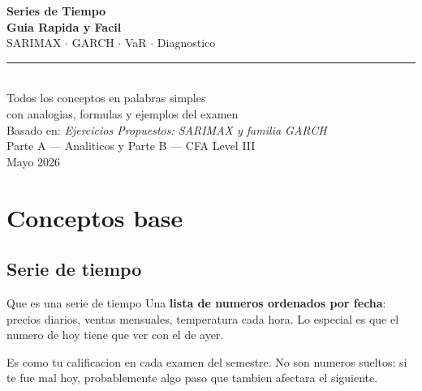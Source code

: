 \documentclass[12pt,a4paper]{article}
\begin{document}

\begin{titlepage}
  \pagecolor{navyblue}
  \color{white}
  \vspace*{3cm}
  \begin{center}
    {\Large\color{teal}\bfseries Series de Tiempo}\\[0.6em]
    {\Huge\bfseries Guia Rapida y Facil}\\[1em]
    {\large\color{midgray} SARIMAX $\cdot$ GARCH $\cdot$ VaR $\cdot$ Diagnostico}\\[2.5em]
    \textcolor{teal}{\rule{8cm}{1.5pt}}\\[2em]
    {\normalsize Todos los conceptos en palabras simples}\\[0.5em]
    {\normalsize\color{midgray} con analogias, formulas y ejemplos del examen}\\[3cm]
    {\small\color{midgray} Basado en: \textit{Ejercicios Propuestos: SARIMAX y familia GARCH}\\
    Parte A --- Analiticos y Parte B --- CFA Level III\\[0.3em]
    Mayo 2026}
  \end{center}
\end{titlepage}
\pagecolor{white}
\color{black}

\tableofcontents
\newpage

\section{Conceptos base}

\subsection{Serie de tiempo}

\begin{definicion}{Que es una serie de tiempo}
Una \textbf{lista de numeros ordenados por fecha}: precios diarios, ventas mensuales,
temperatura cada hora. Lo especial es que el numero de hoy tiene que ver con el de ayer.
\end{definicion}

\begin{analogia}
Es como tu calificacion en cada examen del semestre. No son numeros sueltos:
si te fue mal hoy, probablemente algo paso que tambien afectara el siguiente.
\end{analogia}
\end{document}
